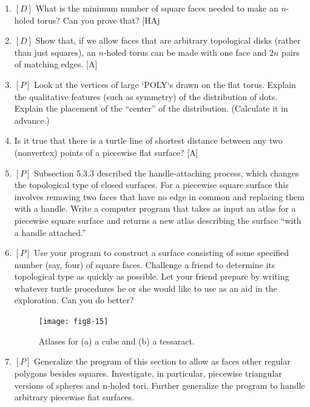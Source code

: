 \documentclass{book}
\begin{document}
\begin{enumerate}
\item $[D]$ What is the minimum number of square faces needed to make an
$n$-holed torus? Can you prove that? [HAj

\item $[D]$ Show that, if we allow faces that are arbitrary topological disks
(rather than just squares), an $n$-holed torus can be made with one face
and $2n$ pairs of matching edges. [A]

\item $[P]$ Look at the vertices of large \textsc{`POLY`}s drawn on the flat torus.
Explain the qualitative features (such as symmetry) of the distribution
of dots. Explain the placement of the ``center'' of the distribution.
(Calculate it in advance.)

\item Is it true that there is a turtle line of shortest distance between any
two (nonvertex) points of a piecewise flat surface? [A]

\item $[P]$ Subsection 5.3.3 described the handle-attaching process, which
changes the topological type of closed surfaces. For a piecewise square
surface this involves removing two faces that have no edge in common
and replacing them with a handle. Write a computer program that takes
as input an atlas for a piecewise square surface and returns a new atlas
describing the surface ``with a handle attached.''

\item $[P]$ Use your program to construct a surface consisting of some specified number (say, four) of square faces. Challenge a friend to determine
its topological type as quickly as possible. Let your friend prepare by
writing whatever turtle procedures he or she would like to use as an aid
in the exploration. Can you do better?

\begin{figure}
\begin{center}
\texttt{[image: fig8-15]}
\caption{Atlases for (a) a cube and (b) a tessaract.}
\end{center}
\end{figure}

\item $[P]$ Generalize the program of this section to allow as faces other
regular polygons besides squares. Investigate, in particular, piecewise
triangular versions of spheres and n-holed tori. Further generalize the
program to handle arbitrary piecewise fiat surfaces.


\end{enumerate}
\end{document}
